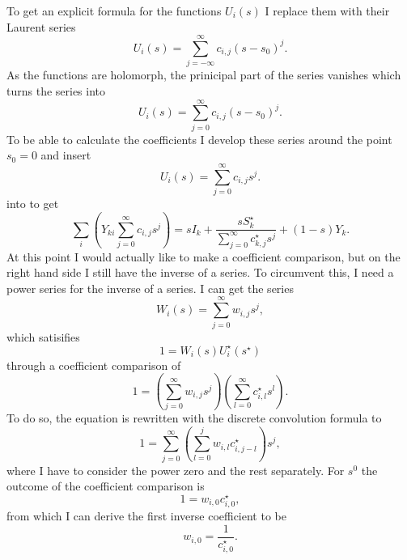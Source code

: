 To get an explicit formula for the functions $U_i(s)$ I replace them with their Laurent series
\begin{equation}
	U_i(s) = \sum_{j = -\infty}^\infty c_{i,j} (s - s_0)^j.
\end{equation}
As the functions are holomorph, the prinicipal part of the series vanishes which turns the series into
\begin{equation}
	U_i(s) = \sum_{j = 0}^\infty c_{i,j} (s - s_0)^j.
\end{equation}
To be able to calculate the coefficients I develop these series around the point $s_0 = 0$ and insert
\begin{equation}
	U_i(s) = \sum_{j = 0}^\infty c_{i,j} s^j.
	\label{eq:helm_series}
\end{equation}
into  to get
\begin{equation}
		\sum_i \left( Y_{ki} \sum_{j = 0}^\infty c_{i,j} s^j \right) = s I_k + \frac{s S_k^\star}{\sum_{j = 0}^\infty c_{k,j}^\star s^j} + (1 - s) Y_k.
		\label{eq:helm_series_pq_bus}
\end{equation}
At this point I would actually like to make a coefficient comparison, but on the right hand side I still have the inverse of a series. To circumvent this, I need a power series for the inverse of a series. I can get the series
\begin{equation}
	W_i(s) = \sum_{j = 0}^\infty w_{i,j} s^j,
\end{equation}
which satisifies
\begin{equation}
	1 = W_i(s) U_i^\star(s^\star)
\end{equation}
through a coefficient comparison of
\begin{equation}
	1 = \left( \sum_{j = 0}^\infty w_{i,j} s^j \right) \left( \sum_{l = 0}^\infty c_{i,l}^\star s^l \right).
\end{equation}
To do so, the equation is rewritten with the discrete convolution formula to
\begin{equation}
	1 = \sum_{j = 0}^\infty \left( \sum_{l = 0}^j w_{i,l} c_{i,j - l}^\star \right) s^j,
\end{equation}
where I have to consider the power zero and the rest separately. For $s^0$ the outcome of the coefficient comparison is
\begin{equation}
	1 = w_{i,0} c_{i,0}^\star,
\end{equation}
from which I can derive the first inverse coefficient to be
\begin{equation}
	w_{i,0} = \frac{1}{c_{i,0}^\star}.
\end{equation}

